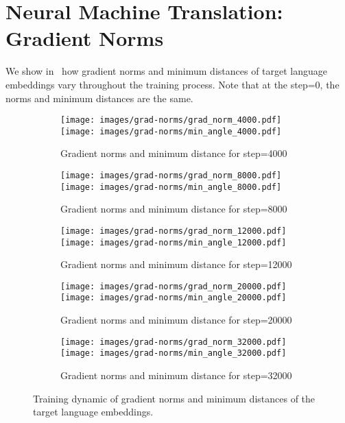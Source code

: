 \documentclass[10pt]{article} %
\begin{document}
\section{Neural Machine Translation: Gradient Norms}
\label{app:grad-norms}
We show in~ how gradient norms and minimum distances of target language embeddings vary throughout the training process. Note that at the step=0, the norms and minimum distances are the same.
\begin{figure}
\begin{subfigure}{\linewidth}
    \centering
    \texttt{[image: images/grad-norms/grad\_norm\_4000.pdf]}\quad
    \texttt{[image: images/grad-norms/min\_angle\_4000.pdf]}
    \caption{Gradient norms and minimum distance for step=4000}
    \end{subfigure}

    \begin{subfigure}{\linewidth}
        \centering
    \texttt{[image: images/grad-norms/grad\_norm\_8000.pdf]}\quad
    \texttt{[image: images/grad-norms/min\_angle\_8000.pdf]}
     \caption{Gradient norms and minimum distance for step=8000}
    \end{subfigure}
    
    \begin{subfigure}{\linewidth}
        \centering
        \texttt{[image: images/grad-norms/grad\_norm\_12000.pdf]}\quad
        \texttt{[image: images/grad-norms/min\_angle\_12000.pdf]}
        \caption{Gradient norms and minimum distance for step=12000}
        \end{subfigure}
    
    \begin{subfigure}{\linewidth}
        \centering
        \texttt{[image: images/grad-norms/grad\_norm\_20000.pdf]}\quad
        \texttt{[image: images/grad-norms/min\_angle\_20000.pdf]}
        \caption{Gradient norms and minimum distance for step=20000}
        \end{subfigure}
    
    \begin{subfigure}{\linewidth}
        \centering
        \texttt{[image: images/grad-norms/grad\_norm\_32000.pdf]}\quad
        \texttt{[image: images/grad-norms/min\_angle\_32000.pdf]}
        \caption{Gradient norms and minimum distance for step=32000}
    \end{subfigure}
    \caption{Training dynamic of gradient norms and minimum distances of the target language embeddings.}
    \label{fig:norms-dists-dynamic}
\end{figure}
\end{document}
